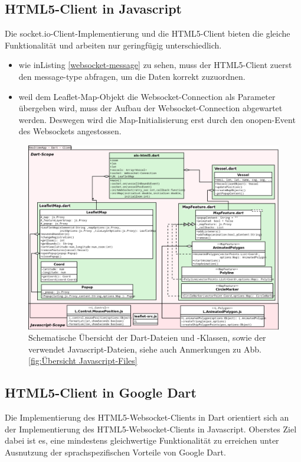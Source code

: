 \subsection{HTML5-Client in Javascript}\label{HTML5-Client in Javascript}
Die socket.io-Client-Implementierung und die HTML5-Client bieten die gleiche Funktionalität und arbeiten nur geringfügig unterschiedlich.
 \begin{itemize}
 \item wie inListing  \ref{websocket-message} zu sehen, muss der HTML5-Client zuerst den message-type abfragen, um die Daten korrekt zuzuordnen.
 \item weil dem Leaflet-Map-Objekt die Websocket-Connection als Parameter übergeben wird, muss der Aufbau der Websocket-Connection abgewartet werden. Deswegen wird die Map-Initialisierung erst durch den onopen-Event des Websockets angestossen.
\end{itemize}


\begin{figure}[H]
  \centering
  \includegraphics[width=6.2in]{images/Dart-DateienUndKlassen.png}
  \caption[Übersicht Dart-Files]{Schematische Übersicht der Dart-Dateien und -Klassen, sowie der verwendet Javascript-Dateien, siehe auch Anmerkungen zu Abb. \ref{fig:Übersicht Javascript-Files}}
  \label{fig:Übersicht Dart-Files}
\end{figure}


\subsection{HTML5-Client in Google Dart}\label{HTML5-Client in Dart}
Die Implementierung des HTML5-Websocket-Clients in Dart orientiert sich an der Implementierung des HTML5-Websocket-Clients in Javascript. Oberstes Ziel dabei ist es, eine mindestens gleichwertige Funktionalität zu erreichen unter Ausnutzung der sprachspezifischen Vorteile von Google Dart. \\

